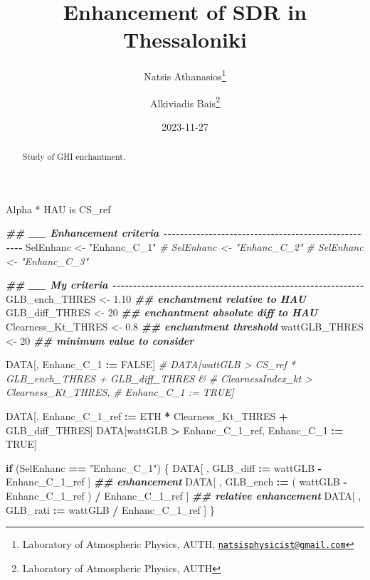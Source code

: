 \documentclass[
  10pt,
  a4paper,oneside]{article}
\title{Enhancement of SDR in Thessaloniki}
\author{Natsis Athanasios\footnote{Laboratory of Atmospheric Physics, AUTH, \href{mailto:natsisphysicist@gmail.com}{\nolinkurl{natsisphysicist@gmail.com}}} \and Alkiviadis Bais\footnote{Laboratory of Atmospheric Physics, AUTH}}
\date{2023-11-27}
\newenvironment{Shaded}{\begin{snugshade}}{\end{snugshade}}
\newcommand{\CommentTok}[1]{\textcolor[rgb]{0.56,0.35,0.01}{\textit{#1}}}
\newcommand{\ConstantTok}[1]{\textcolor[rgb]{0.56,0.35,0.01}{#1}}
\newcommand{\ControlFlowTok}[1]{\textcolor[rgb]{0.13,0.29,0.53}{\textbf{#1}}}
\newcommand{\DecValTok}[1]{\textcolor[rgb]{0.00,0.00,0.81}{#1}}
\newcommand{\DocumentationTok}[1]{\textcolor[rgb]{0.56,0.35,0.01}{\textbf{\textit{#1}}}}
\newcommand{\FloatTok}[1]{\textcolor[rgb]{0.00,0.00,0.81}{#1}}
\newcommand{\NormalTok}[1]{#1}
\newcommand{\OtherTok}[1]{\textcolor[rgb]{0.56,0.35,0.01}{#1}}
\newcommand{\SpecialCharTok}[1]{\textcolor[rgb]{0.81,0.36,0.00}{\textbf{#1}}}
\newcommand{\StringTok}[1]{\textcolor[rgb]{0.31,0.60,0.02}{#1}}
\begin{document}
\maketitle
\begin{abstract}
Study of GHI enchantment.
\end{abstract}

{
\hypersetup{linkcolor=}
\setcounter{tocdepth}{4}
\tableofcontents
}
Alpha * HAU is CS\_ref

\begin{Shaded}
\begin{Highlighting}[]
\DocumentationTok{\#\# \_\_ Enhancement criteria  {-}{-}{-}{-}{-}{-}{-}{-}{-}{-}{-}{-}{-}{-}{-}{-}{-}{-}{-}{-}{-}{-}{-}{-}{-}{-}{-}{-}{-}{-}{-}{-}{-}{-}{-}{-}{-}{-}{-}{-}{-}{-}{-}{-}{-}{-}{-}{-}{-}{-}{-}{-}}
\NormalTok{SelEnhanc }\OtherTok{\textless{}{-}} \StringTok{"Enhanc\_C\_1"}
\CommentTok{\# SelEnhanc \textless{}{-} "Enhanc\_C\_2"}
\CommentTok{\# SelEnhanc \textless{}{-} "Enhanc\_C\_3"}

\DocumentationTok{\#\# \_\_ My criteria  {-}{-}{-}{-}{-}{-}{-}{-}{-}{-}{-}{-}{-}{-}{-}{-}{-}{-}{-}{-}{-}{-}{-}{-}{-}{-}{-}{-}{-}{-}{-}{-}{-}{-}{-}{-}{-}{-}{-}{-}{-}{-}{-}{-}{-}{-}{-}{-}{-}{-}{-}{-}{-}{-}{-}{-}{-}{-}{-}{-}{-}}
\NormalTok{GLB\_ench\_THRES     }\OtherTok{\textless{}{-}}  \FloatTok{1.10} \DocumentationTok{\#\# enchantment relative to HAU}
\NormalTok{GLB\_diff\_THRES     }\OtherTok{\textless{}{-}} \DecValTok{20}    \DocumentationTok{\#\# enchantment absolute diff to HAU}
\NormalTok{Clearness\_Kt\_THRES }\OtherTok{\textless{}{-}}  \FloatTok{0.8}  \DocumentationTok{\#\# enchantment threshold}
\NormalTok{wattGLB\_THRES      }\OtherTok{\textless{}{-}} \DecValTok{20}    \DocumentationTok{\#\# minimum value to consider}

\NormalTok{DATA[, Enhanc\_C\_1 }\SpecialCharTok{:=} \ConstantTok{FALSE}\NormalTok{]}
\CommentTok{\# DATA[wattGLB           \textgreater{} CS\_ref * GLB\_ench\_THRES + GLB\_diff\_THRES \&}
\CommentTok{\#      ClearnessIndex\_kt \textgreater{} Clearness\_Kt\_THRES,}
\CommentTok{\#      Enhanc\_C\_1 := TRUE]}

\NormalTok{DATA[, Enhanc\_C\_1\_ref }\SpecialCharTok{:=}\NormalTok{ ETH }\SpecialCharTok{*}\NormalTok{ Clearness\_Kt\_THRES }\SpecialCharTok{+}\NormalTok{ GLB\_diff\_THRES]}
\NormalTok{DATA[wattGLB }\SpecialCharTok{\textgreater{}}\NormalTok{ Enhanc\_C\_1\_ref,}
\NormalTok{     Enhanc\_C\_1 }\SpecialCharTok{:=} \ConstantTok{TRUE}\NormalTok{]}

\ControlFlowTok{if}\NormalTok{ (SelEnhanc }\SpecialCharTok{==} \StringTok{"Enhanc\_C\_1"}\NormalTok{) \{}
\NormalTok{    DATA[ , GLB\_diff }\SpecialCharTok{:=}\NormalTok{   wattGLB }\SpecialCharTok{{-}}\NormalTok{ Enhanc\_C\_1\_ref                    ] }\DocumentationTok{\#\# enhancement}
\NormalTok{    DATA[ , GLB\_ench }\SpecialCharTok{:=}\NormalTok{ ( wattGLB }\SpecialCharTok{{-}}\NormalTok{ Enhanc\_C\_1\_ref ) }\SpecialCharTok{/}\NormalTok{ Enhanc\_C\_1\_ref ] }\DocumentationTok{\#\# relative enhancement}
\NormalTok{    DATA[ , GLB\_rati }\SpecialCharTok{:=}\NormalTok{   wattGLB }\SpecialCharTok{/}\NormalTok{ Enhanc\_C\_1\_ref                    ]}
\NormalTok{\}}



\end{Highlighting}
\end{Shaded}
\end{document}
